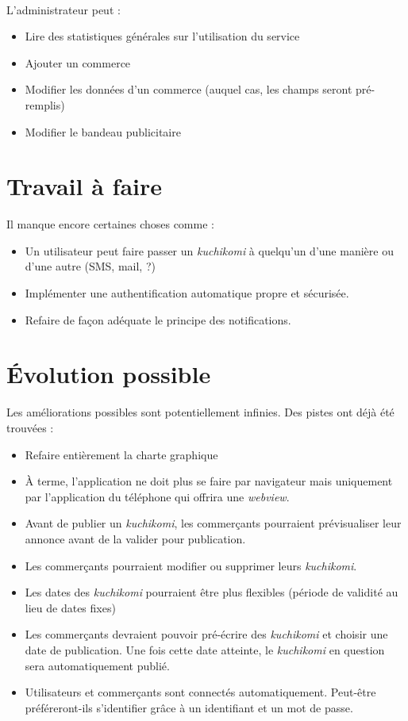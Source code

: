\documentclass[a4paper,12pt,titlepage]{report}
\begin{document}
\newpage
\paragraph*{}
L'administrateur peut :

\begin{itemize}
\item Lire des statistiques générales sur l'utilisation du service
\item Ajouter un commerce
\item Modifier les données d'un commerce (auquel cas, les champs seront pré-remplis)
\item Modifier le bandeau publicitaire
\end{itemize}


\section{Travail à faire}

Il manque encore certaines choses comme :
\begin{itemize}
\item Un utilisateur peut \og faire passer \fg{}  un \emph{kuchikomi} à quelqu'un d'une manière ou d'une autre (SMS, mail, ?)
\item Implémenter une authentification automatique propre et sécurisée.
\item Refaire de façon adéquate le principe des notifications.
\end{itemize}

\section{Évolution possible}

Les améliorations possibles sont potentiellement infinies. Des pistes ont déjà été trouvées :

\begin{itemize}
\item Refaire entièrement la charte graphique
\item À terme, l'application ne doit plus se faire par navigateur mais uniquement par l'application du téléphone qui offrira une \emph{webview}.
\item Avant de publier un \emph{kuchikomi}, les commerçants pourraient prévisualiser leur annonce avant de la valider pour publication.
\item Les commerçants pourraient modifier ou supprimer leurs \emph{kuchikomi}.
\item Les dates des \emph{kuchikomi} pourraient être plus flexibles (période de validité au lieu de dates fixes)
\item Les commerçants devraient pouvoir pré-écrire des \emph{kuchikomi} et choisir une date de publication. Une fois cette date atteinte, le \emph{kuchikomi} en question sera automatiquement publié.
\item Utilisateurs et commerçants sont connectés automatiquement. Peut-être préféreront-ils s'identifier grâce à un identifiant et un mot de passe.
\end{itemize}
\end{document}
